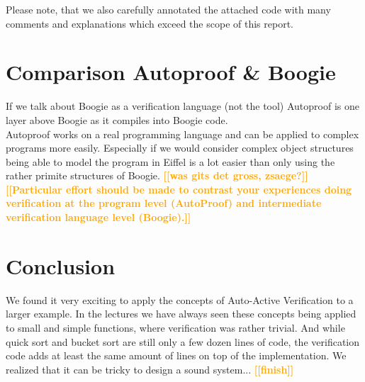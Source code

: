 \documentclass{report}
\newcommand{\todo}[1]{\textsf{\textbf{\textcolor{orange}{[[#1]]}}}}
\begin{document}
Please note, that we also carefully annotated the attached code with many comments and explanations which exceed the scope of this report.

\section{Comparison Autoproof \& Boogie}
\label{s:comparison}
If we talk about Boogie as a verification language (not the tool) Autoproof is one layer above Boogie as it compiles into Boogie code.
\\
Autoproof works on a real programming language and can be applied to complex programs more easily. Especially if we would consider complex object structures being able to model the program in Eiffel is a lot easier than only using the rather primite structures of Boogie.
\todo{was gits det gross, zsaege?}
\\
\todo{Particular effort should be made to contrast your experiences doing verification at the
program level (AutoProof) and intermediate verification language level (Boogie).}

\section{Conclusion}
\label{s:conclusion}
We found it very exciting to apply the concepts of Auto-Active Verification to a larger example. In the lectures we have always seen these concepts being applied to small and simple functions, where verification was rather trivial. And while quick sort and bucket sort are still only a few dozen lines of code, the verification code adds at least the same amount of lines on top of the implementation.
We realized that it can be tricky to design a sound system...
\todo{finish}





\end{document}
